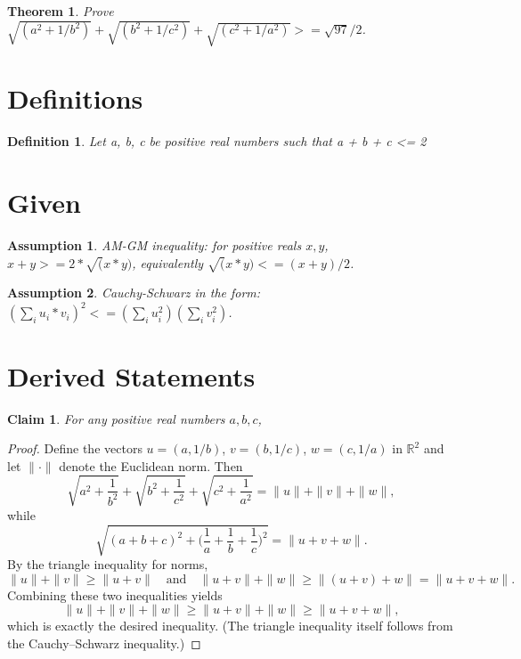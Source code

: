 \documentclass{article}
\newtheorem{theorem}{Theorem}
\newtheorem{claim}{Claim}
\newtheorem{definition}{Definition}
\newtheorem{assumption}{Assumption}
\begin{document}
\begin{theorem}
Prove $\sqrt{(a^2 + 1/b^2)} + \sqrt{(b^2 + 1/c^2)} + \sqrt{(c^2 + 1/a^2)} >= \sqrt{97}/2$.
\end{theorem}

\section*{Definitions}
\begin{definition}
Let a, b, c be positive real numbers such that a + b + c <= 2
\end{definition}

\section*{Given}
\begin{assumption}  %
AM-GM inequality: for positive reals $x, y$, $x + y >= 2*\sqrt(x*y)$, equivalently $\sqrt(x*y) <= (x+y)/2$.
\end{assumption}

\begin{assumption}  %
Cauchy-Schwarz in the form: $(\sum_i u_i * v_i)^2 <= (\sum_i u_i^2)(\sum_i v_i^2)$.
\end{assumption}

\section*{Derived Statements}
\begin{claim}  %
For any positive real numbers $a,b,c$,
\end{claim}
\begin{proof}
Define the vectors $u=(a,1/b)$, $v=(b,1/c)$, $w=(c,1/a)$ in $\mathbb{R}^2$ and let $\|\cdot\|$ denote the Euclidean norm. Then \[ \sqrt{a^2+\frac1{b^2}}+\sqrt{b^2+\frac1{c^2}}+\sqrt{c^2+\frac1{a^2}} = \|u\|+\|v\|+\|w\|, \] while \[ \sqrt{(a+b+c)^2+\bigl(\frac1a+\frac1b+\frac1c\bigr)^2} = \|u+v+w\|. \] By the triangle inequality for norms, \[ \|u\|+\|v\|\ge \|u+v\|\quad\text{and}\quad \|u+v\|+\|w\|\ge \|(u+v)+w\| = \|u+v+w\|. \] Combining these two inequalities yields \[ \|u\|+\|v\|+\|w\| \ge \|u+v\|+\|w\| \ge \|u+v+w\|, \] which is exactly the desired inequality. (The triangle inequality itself follows from the Cauchy–Schwarz inequality.)
\end{proof}
\end{document}
